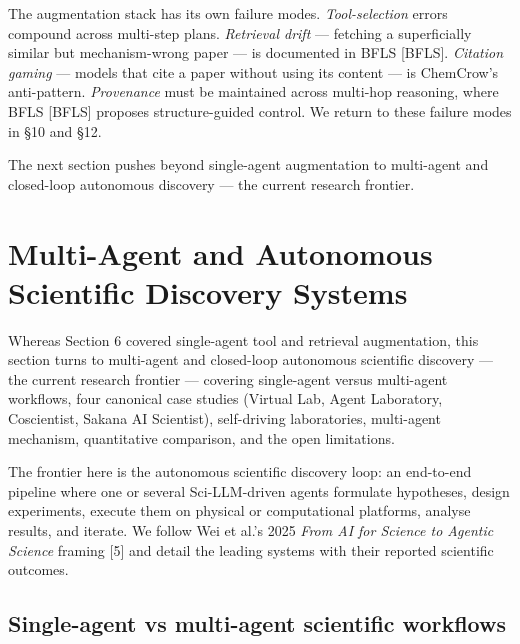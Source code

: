 The augmentation stack has its own failure modes. \emph{Tool-selection} errors compound across multi-step plans. \emph{Retrieval drift} --- fetching a superficially similar but mechanism-wrong paper --- is documented in BFLS {[}BFLS{]}. \emph{Citation gaming} --- models that cite a paper without using its content --- is ChemCrow's anti-pattern. \emph{Provenance} must be maintained across multi-hop reasoning, where BFLS {[}BFLS{]} proposes structure-guided control. We return to these failure modes in §10 and §12.

The next section pushes beyond single-agent augmentation to multi-agent and closed-loop autonomous discovery --- the current research frontier.

\section{Multi-Agent and Autonomous Scientific Discovery Systems}\label{multi-agent-and-autonomous-scientific-discovery-systems}

Whereas Section 6 covered single-agent tool and retrieval augmentation, this section turns to multi-agent and closed-loop autonomous scientific discovery --- the current research frontier --- covering single-agent versus multi-agent workflows, four canonical case studies (Virtual Lab, Agent Laboratory, Coscientist, Sakana AI Scientist), self-driving laboratories, multi-agent mechanism, quantitative comparison, and the open limitations.

The frontier here is the autonomous scientific discovery loop: an end-to-end pipeline where one or several Sci-LLM-driven agents formulate hypotheses, design experiments, execute them on physical or computational platforms, analyse results, and iterate. We follow Wei et al.'s 2025 \emph{From AI for Science to Agentic Science} framing {[}5{]} and detail the leading systems with their reported scientific outcomes.

\subsection{Single-agent vs multi-agent scientific workflows}\label{single-agent-vs-multi-agent-scientific-workflows}

